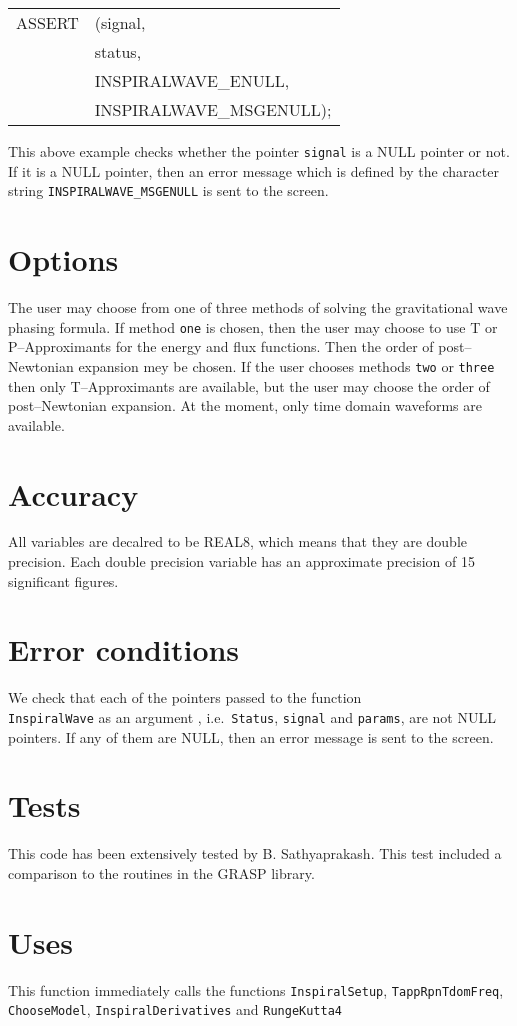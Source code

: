 \documentclass[12pt]{article}
\begin{document}
\vspace{5mm}

\begin{tabular}{ll}
ASSERT & (signal,  \\
       &  status,    \\
       &  INSPIRALWAVE\_ENULL, \\
       &  INSPIRALWAVE\_MSGENULL);
\end{tabular}

\vspace{5mm}

This above example checks whether the pointer \texttt{signal} is a NULL pointer or not. If it is a NULL pointer, then an error message which is defined by the character string \texttt{INSPIRALWAVE\_MSGENULL} is sent to the screen.


\section{Options}

The user may choose from one of three methods of solving the gravitational wave phasing formula. If method \texttt{one} is chosen, then the user may choose to use T or P--Approximants for the energy and flux functions. Then the order of post--Newtonian expansion mey be chosen. If the user chooses methods \texttt{two} or \texttt{three} then only T--Approximants are available, but the user may choose the order of post--Newtonian expansion. At the moment, only time domain waveforms are available.

\section{Accuracy}

All variables are decalred to be REAL8, which means that they are double precision.
Each double precision variable has an approximate precision of 15 significant figures.


\section{Error conditions}

We check that each of the pointers passed to the function \\ \texttt{InspiralWave} as an argument , i.e.\ \texttt{Status}, \texttt{signal} and \texttt{params}, are not NULL pointers. If any of them are NULL, then an error message is sent to the screen.


\section{Tests}

This code has been extensively tested by B. Sathyaprakash. This test included a comparison to the routines in the GRASP library.

\section{Uses}

This function immediately calls the functions \texttt{InspiralSetup}, \texttt{TappRpnTdomFreq}, \texttt{ChooseModel}, \texttt{InspiralDerivatives} and \texttt{RungeKutta4}
\end{document}
